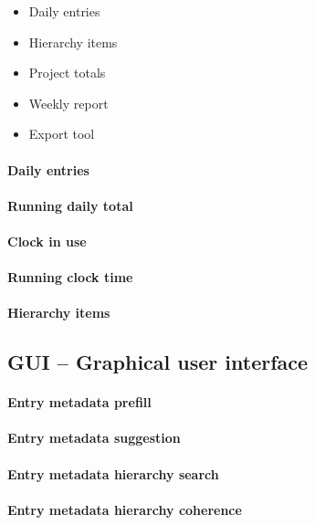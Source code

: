 \begin{itemize}
\item Daily entries
\item Hierarchy items
\item Project totals
\item Weekly report
\item Export tool
\end{itemize}

\paragraph{Daily entries}

\paragraph{Running daily total}

\paragraph{Clock in use}

\paragraph{Running clock time}

\paragraph{Hierarchy items}

\subsection{GUI -- Graphical user interface}
\paragraph{Entry metadata prefill}

\paragraph{Entry metadata suggestion}

\paragraph{Entry metadata hierarchy search}

\paragraph{Entry metadata hierarchy coherence}


